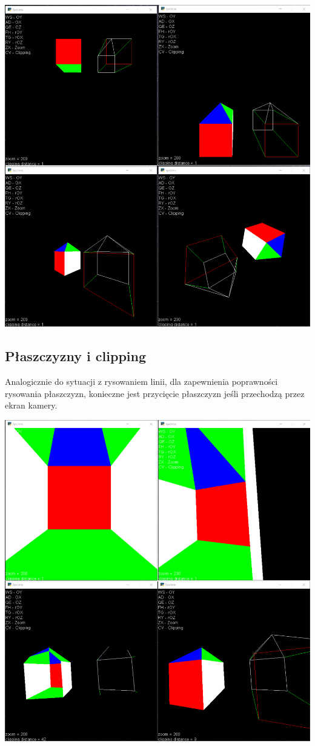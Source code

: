 \documentclass[12pt]{article}
\begin{document}
\begin{center}
    \noindent\includegraphics[scale=0.5]{spolens planes.png}
\end{center}
\newpage

\subsection{Płaszczyzny i clipping}
Analogicznie do sytuacji z rysowaniem linii, dla zapewnienia poprawności rysowania płaszczyzn, konieczne jest przycięcie płaszczyzn jeśli przechodzą przez ekran kamery.

\begin{center}
    \noindent\includegraphics[scale=0.5]{spolens planes clip.png}
\end{center}
\end{document}

